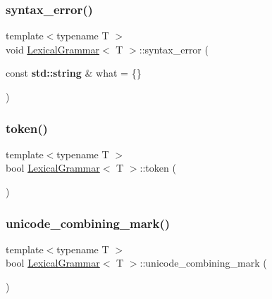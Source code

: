 \mbox{\label{class_lexical_grammar_a939edcfd509e8c3814f0c704822ad61a}} 
\subsubsection{\texorpdfstring{syntax\+\_\+error()}{syntax\_error()}}
{\footnotesize\ttfamily template$<$typename T $>$ \\
void \hyperlink{class_lexical_grammar}{Lexical\+Grammar}$<$ T $>$\+::syntax\+\_\+error (\begin{DoxyParamCaption}\item[{const \textbf{ std\+::string} \&}]{what = {\ttfamily \{\}} }\end{DoxyParamCaption})\hspace{0.3cm}{\ttfamily [inline]}}

\mbox{\label{class_lexical_grammar_ac728c2390815a0710dcf393763771f2c}} 
\subsubsection{\texorpdfstring{token()}{token()}}
{\footnotesize\ttfamily template$<$typename T $>$ \\
bool \hyperlink{class_lexical_grammar}{Lexical\+Grammar}$<$ T $>$\+::token (\begin{DoxyParamCaption}{ }\end{DoxyParamCaption})\hspace{0.3cm}{\ttfamily [inline]}}

\mbox{\label{class_lexical_grammar_ab16506f8bcae0aa05d7f6971d0355d9c}} 
\subsubsection{\texorpdfstring{unicode\+\_\+combining\+\_\+mark()}{unicode\_combining\_mark()}}
{\footnotesize\ttfamily template$<$typename T $>$ \\
bool \hyperlink{class_lexical_grammar}{Lexical\+Grammar}$<$ T $>$\+::unicode\+\_\+combining\+\_\+mark (\begin{DoxyParamCaption}{ }\end{DoxyParamCaption})\hspace{0.3cm}{\ttfamily [inline]}}

